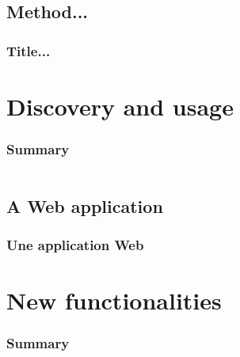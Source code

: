 \documentclass[]{beamer}
\begin{document}
\subsection{Method...}
\begin{frame}
    \frametitle{Title...}
    \framesubtitle{}
\end{frame}




%
%
\section{Discovery and usage}
\begin{frame}
    \frametitle{Summary}
    \begin{columns}[t]
        \begin{column}{5cm}
            \tableofcontents[sections={1-3}, currentsection, hideothersubsections]
        \end{column}
        \begin{column}{5cm}
            \tableofcontents[sections={4-5}, currentsection, hideothersubsections]
        \end{column}
    \end{columns}
\end{frame}
\subsection{A Web application}
\begin{frame}
    \frametitle{Une application Web}
    \framesubtitle{}
\end{frame}




%
%
\section{New functionalities}
\begin{frame}
    \frametitle{Summary}
    \begin{columns}[t]
        \begin{column}{5cm}
            \tableofcontents[sections={1-3}, currentsection, hideothersubsections]
        \end{column}
        \begin{column}{5cm}
            \tableofcontents[sections={4-5}, currentsection, hideothersubsections]
        \end{column}
    \end{columns}
\end{frame}
\end{document}
